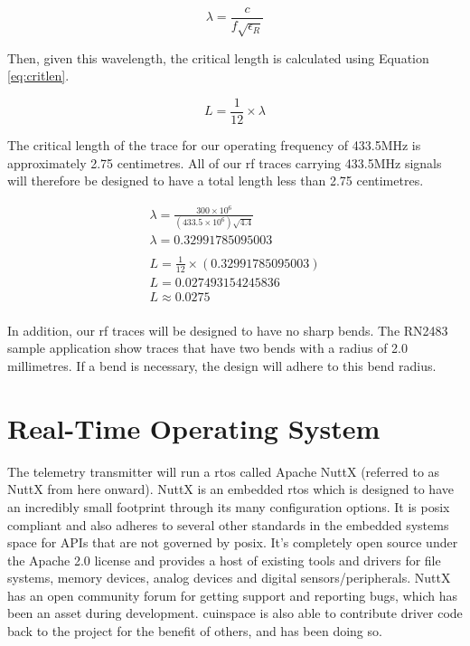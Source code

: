 \begin{equation}
    \lambda = \frac{c}{f\sqrt{\epsilon_R}}
\end{equation} \label{eq:wavelength}

Then, given this wavelength, the critical length is calculated using Equation \ref{eq:critlen}.

\begin{equation}
    L = \frac{1}{12} \times \lambda
\end{equation} \label{eq:critlen}

The critical length of the trace for our operating frequency of 433.5MHz is approximately 2.75 centimetres. All of our
\gls{rf} traces carrying 433.5MHz signals will therefore be designed to have a total length less than 2.75 centimetres.

\begin{gather*}
    \lambda = \frac{300 \times 10^6}{(433.5 \times 10^6)\sqrt{4.4}} \\
    \lambda = 0.32991785095003 \\
    \\
    L = \frac{1}{12} \times (0.32991785095003) \\
    L = 0.027493154245836 \\
    L \approx 0.0275 \\
\end{gather*}

In addition, our \gls{rf} traces will be designed to have no sharp bends. The RN2483 sample application show traces
that have two bends with a radius of 2.0 millimetres. \cite[Sec. 5.1]{rn2483-datasheet} If a bend is necessary, the
design will adhere to this bend radius.

\section{Real-Time Operating System}

The telemetry transmitter will run a \gls{rtos} called Apache NuttX (referred to as NuttX from here onward). NuttX is
an embedded \gls{rtos} which is designed to have an incredibly small footprint through its many configuration options.
\cite{nuttx-about} It is \gls{posix} compliant and also adheres to several other standards in the embedded systems
space for APIs that are not governed by \gls{posix}. \cite{nuttx-about} It's completely open source under the Apache
2.0 license and provides a host of existing tools and drivers for file systems, memory devices, analog devices and
digital sensors/peripherals. NuttX has an open community forum for getting support and reporting bugs, which has been
an asset during development. \Gls{cuinspace} is also able to contribute driver code back to the project for the benefit
of others, and has been doing so.

